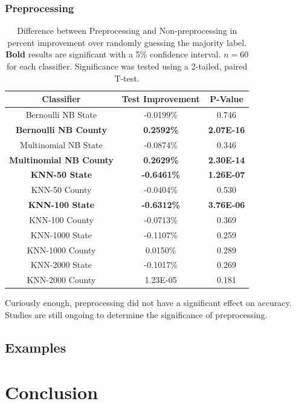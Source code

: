 \documentclass[midd]{thesis}
\begin{document}
\subsection{Preprocessing}


\begin{table}
\label{fig:preprocessingResults}
\caption{Difference between Preprocessing and Non-preprocessing in percent improvement over randomly guessing the majority label. \textbf{Bold} results are significant with a 5\% confidence interval. $n=60$ for each classifier. Significance was tested using a 2-tailed, paired T-test.\newline}
\centering 
  \begin{tabular}{| c | c | c |}
  \hline      
  Classifier & Test Improvement & P-Value \\
  \hline                 
Bernoulli NB State & -0.0199\% & 0.746 \\
\textbf{Bernoulli NB County} & \textbf{0.2592\%} & \textbf{2.07E-16} \\
Multinomial NB State & -0.0874\% & 0.346 \\
\textbf{Multinomial NB County} & \textbf{0.2629\%} & \textbf{2.30E-14} \\
\textbf{KNN-50 State} & \textbf{-0.6461\%} & \textbf{1.26E-07} \\
KNN-50 County & -0.0404\% & 0.530 \\
\textbf{KNN-100 State} & \textbf{-0.6312\%} & \textbf{3.76E-06} \\
KNN-100 County & -0.0713\% & 0.369 \\
KNN-1000 State & -0.1107\% & 0.259 \\
KNN-1000 County & 0.0150\% & 0.289 \\
KNN-2000 State & -0.1017\% & 0.269 \\
KNN-2000 County & 1.23E-05 & 0.181 \\
  \hline  
  \end{tabular}
\end{table}



Curiously enough, preprocessing did not have a significant effect on accuracy. Studies are still ongoing to determine the significance of preprocessing.




\section{Examples}

\chapter{Conclusion}
\end{document}
